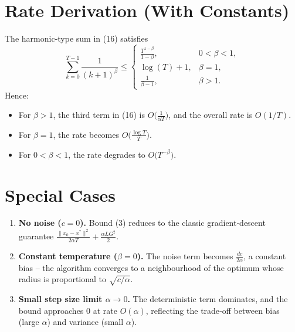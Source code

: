 \documentclass{article}
\begin{document}
\section*{Rate Derivation (With Constants)}
The harmonic‑type sum in (16) satisfies
\[
\sum_{k=0}^{T-1}\frac{1}{(k+1)^{\beta}}
\le
\begin{cases}
\displaystyle \frac{T^{1-\beta}}{1-\beta}, & 0<\beta<1,\\[6pt]
\displaystyle \log(T)+1, & \beta=1,\\[6pt]
\displaystyle \frac{1}{\beta-1}, & \beta>1 .
\end{cases}
\tag{17}
\]
Hence:

\begin{itemize}
\item For $\beta>1$, the third term in (16) is $O\!\bigl(\frac{1}{\alpha T}\bigr)$, and the overall rate is $O(1/T)$.
\item For $\beta=1$, the rate becomes $O\bigl(\frac{\log T}{T}\bigr)$.
\item For $0<\beta<1$, the rate degrades to $O\bigl(T^{-\beta}\bigr)$.
\end{itemize}

\section*{Special Cases}
\begin{enumerate}[label=(\alph*)]
\item \textbf{No noise ($c=0$).} Bound (3) reduces to the classic gradient‑descent guarantee $\frac{\|x_{0}-x^{*}\|^{2}}{2\alpha T}+\frac{\alpha L G^{2}}{2}$.
\item \textbf{Constant temperature ($\beta=0$).} The noise term becomes $\frac{d c}{2\alpha}$, a constant bias – the algorithm converges to a neighbourhood of the optimum whose radius is proportional to $\sqrt{c/\alpha}$.
\item \textbf{Small step size limit $\alpha\to0$.} The deterministic term dominates, and the bound approaches $0$ at rate $O(\alpha)$, reflecting the trade‑off between bias (large $\alpha$) and variance (small $\alpha$).
\end{enumerate}
\end{document}
